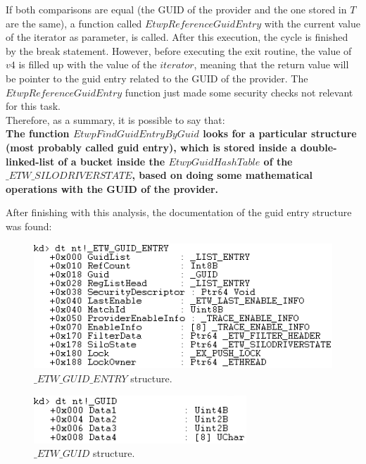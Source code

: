   If both comparisons are equal (the GUID of the provider and the one stored in $T$ are the same), a function called $EtwpReferenceGuidEntry$ with the current value of the iterator as parameter, is called. After this execution, the cycle is finished by the break statement. However, before executing the exit routine, the value of $v4$ is filled up with the value of the $iterator$, meaning that the return value will be pointer to the guid entry related to the GUID of the provider. The $EtwpReferenceGuidEntry$ function just made some security checks not relevant for this task. \\

  Therefore, as a summary, it is possible to say that:\\
  {\bfseries The function $EtwpFindGuidEntryByGuid$ looks for a particular structure (most probably called guid entry), which is stored inside a double-linked-list of a bucket inside the $EtwpGuidHashTable$ of the $\_ETW\_SILODRIVERSTATE$, based on doing some mathematical operations with the GUID of the provider.}

  After finishing with this analysis, the documentation of the guid entry structure was found: 

  \begin{centering}
    \begin{figure}[H]
      \includegraphics[width=12cm]{images/etwguidentrylayout.png}
      \caption[]{$\_ETW\_GUID\_ENTRY$ structure.}
      \label{fig:etwguidentrylayout}
    \end{figure}
  \end{centering}

  \begin{centering}
    \begin{figure}[H]
      \includegraphics[width=8cm]{images/etwguidlayout.png}
      \caption[]{$\_ETW\_GUID$ structure.}
      \label{fig:guidlayout}
    \end{figure}
  \end{centering}
  

